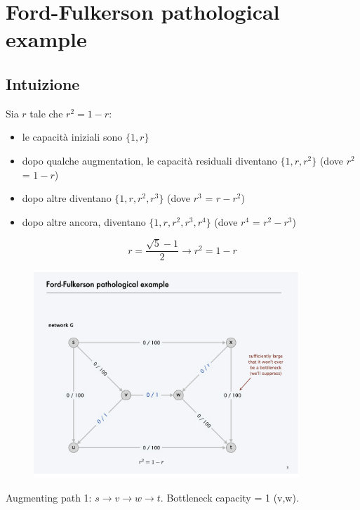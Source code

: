 \chapter{Ford-Fulkerson pathological example}

\section{Intuizione}

Sia $r$ tale che $r^2 = 1-r$:
\begin{itemize}
  \item le capacità iniziali sono $\{1, r\}$
  \item dopo qualche augmentation, le capacità residuali
        diventano $\{1,r,r^2\}$ (dove $r^2$ = $1-r$)
  \item dopo altre diventano $\{1,r,r^2, r^3\}$
        (dove $r^3$ = $r-r^2$)
  \item dopo altre ancora, diventano $\{1,r,r^2, r^3, r^4\}$
        (dove $r^4$ = $r^2-r^3$)
\end{itemize}
$$
  r = \frac{\sqrt{5}-1}{2} \rightarrow r^2 = 1 - r
$$

\begin{figure}[H]
  \centering
  \includegraphics[width=10cm]{capitoli/network_flow/imgs/pathological_example.png}
\end{figure}

Augmenting path 1: $s \to v \to w \to t$. Bottleneck capacity = 1
(v,w).\\


